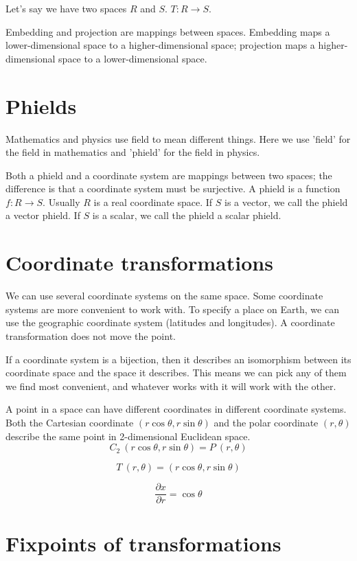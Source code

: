 Let's say we have two spaces $R$ and $S$.
$T : R \to S$.

Embedding and projection are mappings between spaces.
Embedding maps a lower-dimensional space to a higher-dimensional space;
projection maps a higher-dimensional space to a lower-dimensional space.

\section{Phields}

Mathematics and physics use field to mean different things.
Here we use 'field' for the field in mathematics
and 'phield' for the field in physics.

Both a phield and a coordinate system are mappings between two spaces;
the difference is that a coordinate system must be surjective.
A phield is a function $f : R \to S$.
Usually $R$ is a real coordinate space.
If $S$ is a vector, we call the phield a vector phield.
If $S$ is a scalar, we call the phield a scalar phield.

\section{Coordinate transformations}

We can use several coordinate systems on the same space.
Some coordinate systems are more convenient to work with.
To specify a place on Earth, we can use the
geographic coordinate system (latitudes and longitudes).
A coordinate transformation does not move the point.

If a coordinate system is a bijection,
then it describes an isomorphism between
its coordinate space and the space it describes.
This means we can pick any of them we find most convenient,
and whatever works with it will work with the other.

A point in a space can have different coordinates in different coordinate systems.
Both the Cartesian coordinate $(r\cos\theta, r\sin\theta)$ and the polar coordinate $(r,\theta)$
describe the same point in 2-dimensional Euclidean space.
\[
C_2~(r\cos\theta, r\sin\theta) = P~(r,\theta)
\]

\[
T~(r,\theta) = (r \cos \theta, r \sin \theta)
\]

\[
\frac{\partial x}{\partial r} = \cos \theta
\]

\section{Fixpoints of transformations}

